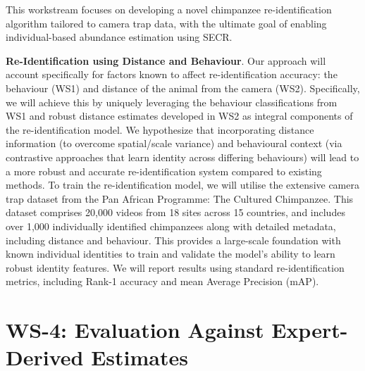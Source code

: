 This workstream focuses on developing a novel chimpanzee re-identification algorithm tailored to camera trap data, with the ultimate goal of enabling individual-based abundance estimation using SECR.

\textbf{Re-Identiﬁcation using Distance and Behaviour}. Our approach will account specifically for factors known to affect re-identification accuracy: the behaviour (WS1) and distance of the animal from the camera (WS2). Specifically, we will achieve this by uniquely leveraging the behaviour classifications from WS1 and robust distance estimates developed in WS2 as integral components of the re-identification model. We hypothesize that incorporating distance information (to overcome spatial/scale variance) and behavioural context (via contrastive approaches that learn identity across differing behaviours) will lead to a more robust and accurate re-identification system compared to existing methods. %
To train the re-identification model, we will utilise the extensive camera trap dataset from the Pan African Programme: The Cultured Chimpanzee. This dataset comprises 20,000 videos from 18 sites across 15 countries, and includes over 1,000 individually identified chimpanzees along with detailed metadata, including distance and behaviour. This provides a large-scale foundation with known individual identities to train and validate the model’s ability to learn robust identity features. We will report results using standard re-identification metrics, including Rank-1 accuracy and mean Average Precision (mAP).


\section*{WS-4: Evaluation Against Expert-Derived Estimates}

